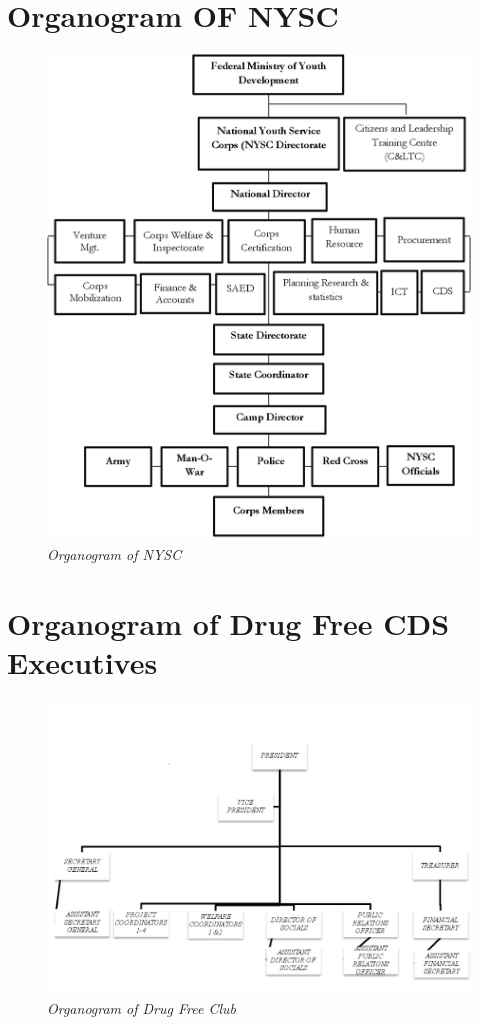 \documentclass{report}
\begin{document}
\section{Organogram OF NYSC}
\begin{figure}[H]
    \centering
    \includegraphics[scale = 0.4]{image2.png}
    \caption{\textit{Organogram of NYSC}}
    \label{fig:my_label}
\end{figure}

\section{Organogram of Drug Free CDS Executives}
\begin{figure}[H]
    \centering
    \includegraphics[scale = 0.4]{organogram.jpg}
    \caption{\textit{Organogram of Drug Free Club}}
    \label{fig:my_label}
\end{figure}
\end{document}
